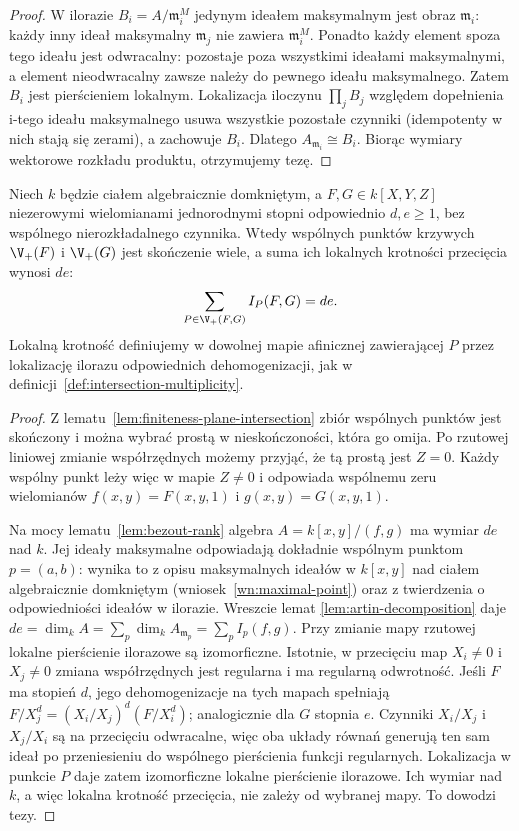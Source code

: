 \begin{proof}
W ilorazie $B_i=A/\mathfrak m_i^M$ jedynym ideałem maksymalnym
jest obraz $\mathfrak m_i$: każdy inny ideał maksymalny
$\mathfrak m_j$ nie zawiera $\mathfrak m_i^M$.
Ponadto każdy element spoza tego ideału jest odwracalny:
pozostaje poza wszystkimi ideałami maksymalnymi, a element
nieodwracalny zawsze należy do pewnego ideału maksymalnego.
Zatem $B_i$ jest pierścieniem lokalnym.
Lokalizacja iloczynu $\prod_j B_j$ względem dopełnienia
i-tego ideału maksymalnego usuwa wszystkie pozostałe czynniki
(idempotenty w nich stają się zerami), a zachowuje $B_i$.
Dlatego $A_{\mathfrak m_i}\cong B_i$. Biorąc wymiary
wektorowe rozkładu produktu, otrzymujemy tezę.
\end{proof}

\begin{twierdzenie}
\label{tw:bezout-general}
Niech $k$ będzie ciałem algebraicznie domkniętym,
a $F,G\in k[X,Y,Z]$ niezerowymi wielomianami jednorodnymi
stopni odpowiednio $d,e\ge1$, bez wspólnego
nierozkładalnego czynnika. Wtedy wspólnych punktów
krzywych $\V_+(F)$ i $\V_+(G)$ jest skończenie wiele,
a suma ich lokalnych krotności przecięcia wynosi $de$:
\[
 \sum_{P\in\V_+(F,G)} I_P(F,G)=de.
\]
Lokalną krotność definiujemy w dowolnej mapie afinicznej
zawierającej $P$ przez lokalizację ilorazu odpowiednich
dehomogenizacji, jak w definicji~\ref{def:intersection-multiplicity}.
\end{twierdzenie}
\begin{proof}
Z lematu~\ref{lem:finiteness-plane-intersection} zbiór
wspólnych punktów jest skończony i można wybrać prostą
w nieskończoności, która go omija. Po rzutowej liniowej
zmianie współrzędnych możemy przyjąć, że tą prostą
jest $Z=0$. Każdy wspólny punkt leży więc w mapie
$Z\ne0$ i odpowiada wspólnemu zeru wielomianów
$f(x,y)=F(x,y,1)$ i $g(x,y)=G(x,y,1)$.

Na mocy lematu~\ref{lem:bezout-rank} algebra
$A=k[x,y]/(f,g)$ ma wymiar $de$ nad $k$.
Jej ideały maksymalne odpowiadają dokładnie wspólnym
punktom $p=(a,b)$: wynika to z opisu maksymalnych ideałów
w $k[x,y]$ nad ciałem algebraicznie domkniętym
(wniosek~\ref{wn:maximal-point}) oraz z twierdzenia
o odpowiedniości ideałów w ilorazie. Wreszcie lemat
\ref{lem:artin-decomposition} daje
$de=\dim_k A=\sum_{p}\dim_k A_{\mathfrak m_p}
=\sum_p I_p(f,g)$. Przy zmianie mapy rzutowej
lokalne pierścienie ilorazowe są izomorficzne.
Istotnie, w przecięciu map $X_i\ne0$ i $X_j\ne0$
zmiana współrzędnych jest regularna i ma regularną odwrotność.
Jeśli $F$ ma stopień $d$, jego dehomogenizacje na tych
mapach spełniają $F/X_j^d=(X_i/X_j)^d(F/X_i^d)$;
analogicznie dla $G$ stopnia $e$. Czynniki $X_i/X_j$
i $X_j/X_i$ są na przecięciu odwracalne, więc
oba układy równań generują ten sam ideał po
przeniesieniu do wspólnego pierścienia funkcji
regularnych. Lokalizacja w punkcie $P$ daje zatem
izomorficzne lokalne pierścienie ilorazowe.
Ich wymiar nad $k$, a więc lokalna krotność przecięcia,
nie zależy od wybranej mapy. To dowodzi tezy.
\end{proof}

